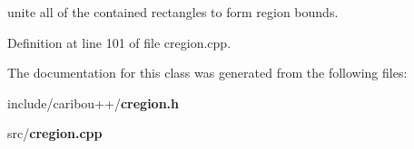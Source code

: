 unite all of the contained rectangles to form region bounds. 



Definition at line 101 of file cregion.\-cpp.



The documentation for this class was generated from the following files\-:\begin{DoxyCompactItemize}
\item 
include/caribou++/{\bf cregion.\-h}\item 
src/{\bf cregion.\-cpp}\end{DoxyCompactItemize}
